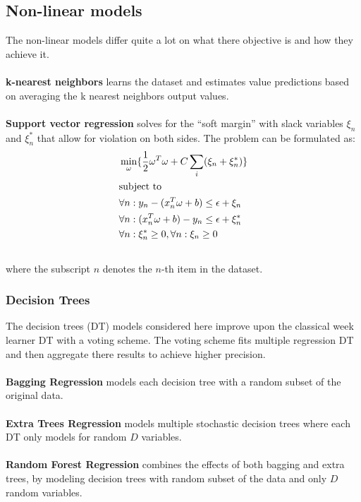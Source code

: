 \documentclass[a4paper]{article}
\begin{document}
\subsection{Non-linear models}
The non-linear models differ quite a lot on what there objective is and how they achieve it. \\\\
\textbf{k-nearest neighbors} learns the dataset and estimates value predictions based on averaging the k nearest neighbors output values. \\\\
\textbf{Support vector regression} solves for the “soft margin” with slack variables $\xi_n$ and $\xi_n^*$ that allow for violation on both sides. The problem can be formulated as:
\begin{align} \label{eq:5}
    &\min_{\omega} \{\frac{1}{2}\omega^T\omega + C\sum_i(\xi_n + \xi_n^*)\} \notag \\
&\text{subject to} \notag \\
    & \forall n : y_n - (x_n^T\omega + b) \leq \epsilon + \xi_n \notag \\
    & \forall n : (x_n^T\omega + b) - y_n\leq \epsilon + \xi_n^* \notag \\
    & \forall n : \xi_n^* \geq 0, \forall n : \xi_n \geq 0 \notag \\ \notag
\end{align} %
where the subscript $n$ denotes the $n$-th item in the dataset.
\subsubsection{Decision Trees}
The decision trees (DT) models considered here improve upon the classical week learner DT with a voting scheme. The voting scheme fits multiple regression DT and then aggregate there results to achieve higher precision. \\\\
\textbf{Bagging Regression} models each decision tree with a random subset of the original data. \\\\
\textbf{Extra Trees Regression} models multiple stochastic decision trees where each DT only models for random $D$ variables. \\\\
\textbf{Random Forest Regression} combines the effects of both bagging and extra trees, by modeling decision trees with random subset of the data and only $D$ random variables.
\end{document}
